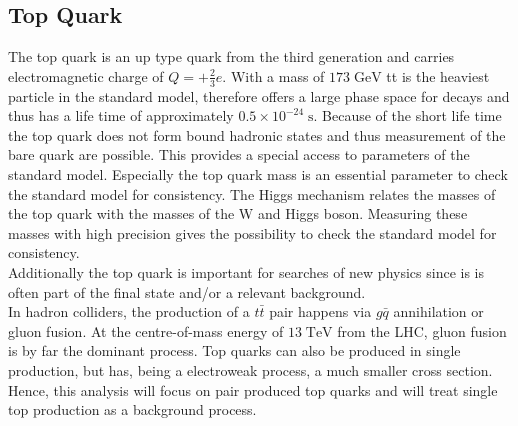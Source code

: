\subsection{Top Quark}
	The top quark is an up type quark from the third generation and carries electromagnetic charge of $Q=+\frac{2}{3}e$. With a mass of $173\;\text{GeV}$ tt is the heaviest particle in the standard model, therefore offers a large phase space for decays and thus has a life time of approximately $0.5 \times 10^{-24}\;\text{s}$. Because of the short life time the top quark does not form bound hadronic states and thus measurement of the bare quark are possible. This provides a special access to parameters of the standard model. Especially the top quark mass is an essential parameter to check the standard model for consistency. The Higgs mechanism relates the masses of the top quark with the masses of the W and Higgs boson. Measuring these masses with high precision gives the possibility to check the standard model for consistency.
	\\
	Additionally the top quark is important for searches of new physics since is is often part of the final state and/or a relevant background. 
	\\
	In hadron colliders, the production of a $t\bar{t}$ pair happens via $g\bar{q}$ annihilation or gluon fusion. At the centre-of-mass energy of $13\;\text{TeV}$ from the LHC, gluon fusion is by far the dominant process. Top quarks can also be produced in single production, but has, being a electroweak process, a much smaller cross section. Hence, this analysis will focus on pair produced top quarks and will treat single top production as a background process.
